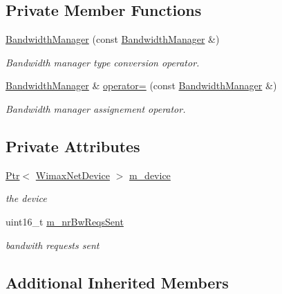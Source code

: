 \subsection*{Private Member Functions}
\begin{DoxyCompactItemize}
\item 
\hyperlink{classns3_1_1BandwidthManager_a55e9833ade6726f77e582e1452728412}{Bandwidth\+Manager} (const \hyperlink{classns3_1_1BandwidthManager}{Bandwidth\+Manager} \&)
\begin{DoxyCompactList}\small\item\em Bandwidth manager type conversion operator. \end{DoxyCompactList}\item 
\hyperlink{classns3_1_1BandwidthManager}{Bandwidth\+Manager} \& \hyperlink{classns3_1_1BandwidthManager_a9bed6c6968629ab4d8ea50f6878f3f20}{operator=} (const \hyperlink{classns3_1_1BandwidthManager}{Bandwidth\+Manager} \&)
\begin{DoxyCompactList}\small\item\em Bandwidth manager assignement operator. \end{DoxyCompactList}\end{DoxyCompactItemize}
\subsection*{Private Attributes}
\begin{DoxyCompactItemize}
\item 
\hyperlink{classns3_1_1Ptr}{Ptr}$<$ \hyperlink{classns3_1_1WimaxNetDevice}{Wimax\+Net\+Device} $>$ \hyperlink{classns3_1_1BandwidthManager_a55eadfdb1964dad9875f14dfcf48eaed}{m\+\_\+device}
\begin{DoxyCompactList}\small\item\em the device \end{DoxyCompactList}\item 
uint16\+\_\+t \hyperlink{classns3_1_1BandwidthManager_a18a831b18bb05ea6c9c48b77c3f1ac17}{m\+\_\+nr\+Bw\+Reqs\+Sent}
\begin{DoxyCompactList}\small\item\em bandwith requests sent \end{DoxyCompactList}\end{DoxyCompactItemize}
\subsection*{Additional Inherited Members}


